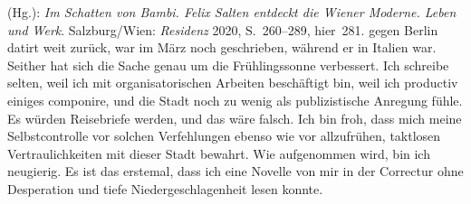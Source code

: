 \begin{ledgroupsized}[t]{13cm}
{{{                     (Hg.): \emph{Im Schatten von Bambi. Felix Salten entdeckt die Wiener
                        Moderne. Leben und Werk}.
                     Salzburg/Wien:
                        \emph{Residenz}{ }2020, S. 260–289, hier 281.}}}\label{K_L03422-5h}
               gegen Berlin datirt weit zurück, war im März noch geschrieben, während er in Italien war. Seither hat sich die Sache genau um die
               Frühlingssonne verbessert. Ich schreibe selten, weil ich mit organisatorischen
               Arbeiten beschäftigt bin, weil ich productiv einiges componire, und die Stadt noch zu wenig als
               publizistische Anregung fühle. Es würden Reisebriefe werden, und das wäre falsch. Ich
               bin froh, dass mich meine Selbstcontrolle {\pb}vor solchen Verfehlungen ebenso
               wie vor allzufrühen, taktlosen Vertraulichkeiten mit dieser Stadt bewahrt.\pend
           \pstart
           Wie \label{K_L03422-6v}\label{K_L03422-6h} aufgenommen wird, bin ich
               neugierig. Es ist das erstemal, dass ich eine Novelle von mir in der Correctur ohne
               Desperation und tiefe Niedergeschlagenheit lesen konnte.\pend
           \pstart

\end{ledgroupsized}
